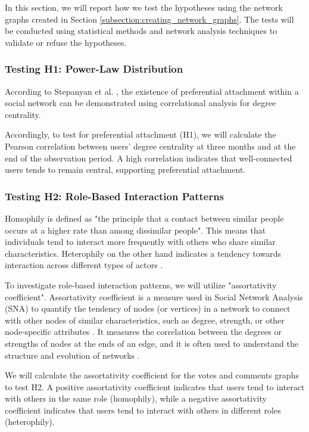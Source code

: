 \documentclass[12pt]{article}
\begin{document}
In this section, we will report how we test the hypotheses using the network graphs created in Section \ref{subsection:creating_network_graphs}. The tests will be conducted using statistical methods and network analysis techniques to validate or refuse the hypotheses.

\subsubsection{Testing H1: Power-Law Distribution}
\label{subsubsection:testing_h1_power_law_distribution}
According to Stepanyan et al. \cite{stepanyan2014culture}, the existence of preferential attachment within a social network can be demonstrated using correlational analysis for degree centrality.

Accordingly, to test for preferential attachment (H1), we will calculate the Pearson correlation between users' degree centrality at three months and at the end of the observation period. A high correlation indicates that well-connected users tends to remain central, supporting preferential attachment.

\subsubsection{Testing H2: Role-Based Interaction Patterns}
\label{subsubsection:testing_h2_role_based_interaction_patterns}
Homophily is defined as "the principle that a contact between similar people occurs at a higher rate than among dissimilar people". This means that individuals tend to interact more frequently with others who share similar characteristics. Heterophily on the other hand indicates a tendency towards interaction across different types of actors \cite{stepanyan2014culture}.

To investigate role-based interaction patterns, we will utilize "assortativity coefficient". Assortativity coefficient is a measure used in Social Network Analysis (SNA) to quantify the tendency of nodes (or vertices) in a network to connect with other nodes of similar characteristics, such as degree, strength, or other node-specific attributes \cite{Wang2016TheHR}. It measures the correlation between the degrees or strengths of nodes at the ends of an edge, and it is often used to understand the structure and evolution of networks \cite{Wang2016TheHR}.

We will calculate the assortativity coefficient for the votes and comments graphs to test H2. A positive assortativity coefficient indicates that users tend to interact with others in the same role (homophily), while a negative assortativity coefficient indicates that users tend to interact with others in different roles (heterophily).
\end{document}
